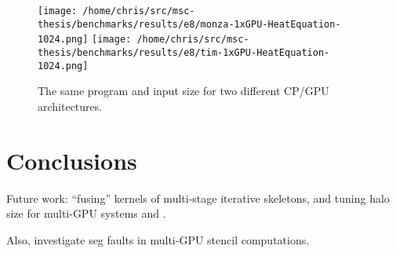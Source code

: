 \begin{figure}
\texttt{[image: /home/chris/src/msc-thesis/benchmarks/results/e8/monza-1xGPU-HeatEquation-1024.png]}
\texttt{[image: /home/chris/src/msc-thesis/benchmarks/results/e8/tim-1xGPU-HeatEquation-1024.png]}
\caption{%
  The same program and input size for two different CP/GPU
  architectures.%
}
\end{figure}


\section{Conclusions}

Future work: ``fusing'' kernels of multi-stage iterative skeletons,
and tuning halo size for multi-GPU systems and .

Also, investigate seg faults in multi-GPU stencil computations.

\label{bibliography}
\printbibliography

